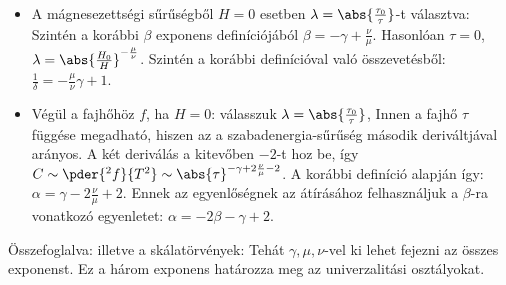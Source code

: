 \begin{itemize}
    \item A mágnesezettségi sűrűségből $H=0$ esetben $\lambda=\abs{\frac{\tau_0}{\tau}}$-t választva:
    Szintén a korábbi $\beta$ exponens definíciójából $\beta=-\gamma+\frac{\nu}{\mu}$.
   Hasonlóan $\tau=0$, $
    \lambda=\abs{\frac{H_0}{H}}^{-\frac{\mu}{\nu}}$.
    Szintén a korábbi definícióval való összevetésből: $\frac{1}{\delta}=-\frac{\mu}{\nu}\gamma+1$.
    
    \item Végül a fajhőhöz $f$, ha $H=0$: válasszuk $\lambda=\abs{\frac{\tau_0}{\tau}}$,
    Innen a fajhő $\tau$ függése megadható, hiszen az a szabadenergia-sűrűség második deriváltjával arányos.
   A két deriválás a kitevőben $-2$-t hoz be, így $C\sim\pder{^2 f}{T^2}\sim \abs{\tau}^{-\gamma+2\frac{\nu}{\mu}-2}$.
   A korábbi definíció alapján így: $\alpha=\gamma-2\frac{\nu}{\mu}+2$.
   Ennek az egyenlőségnek az átírásához felhasználjuk a $\beta$-ra vonatkozó egyenletet: $\alpha=-2\beta-\gamma+2$.
   \end{itemize}
   
   Összefoglalva:
   illetve a skálatörvények:
   Tehát $\gamma,\mu,\nu$-vel ki lehet fejezni az összes exponenst.
   Ez a három exponens határozza meg az univerzalitási osztályokat. 
